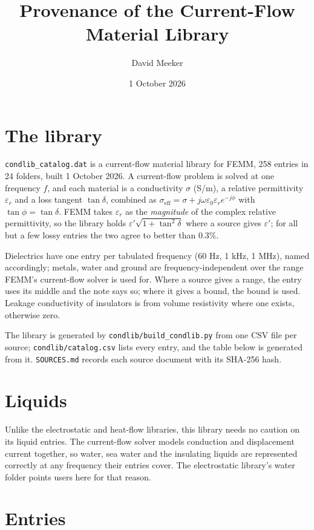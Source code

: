 \documentclass[10pt]{article}
\title{Provenance of the Current-Flow Material Library}
\author{David Meeker}
\date{1 October 2026}
\begin{document}
\maketitle

\section*{The library}

\texttt{condlib\_catalog.dat} is a current-flow material library for FEMM, 258 entries in 24 folders, built 1 October 2026. A current-flow problem is solved at one frequency $f$, and each material is a conductivity $\sigma$ (S/m), a relative permittivity $\varepsilon_r$ and a loss tangent $\tan\delta$, combined as $\sigma_\mathrm{eff} = \sigma + j\omega\varepsilon_0\varepsilon_r e^{-j\phi}$ with $\tan\phi = \tan\delta$. FEMM takes $\varepsilon_r$ as the \emph{magnitude} of the complex relative permittivity, so the library holds $\varepsilon'\sqrt{1+\tan^2\delta}$ where a source gives $\varepsilon'$; for all but a few lossy entries the two agree to better than 0.3\%.

Dielectrics have one entry per tabulated frequency (60 Hz, 1 kHz, 1 MHz), named accordingly; metals, water and ground are frequency-independent over the range FEMM's current-flow solver is used for. Where a source gives a range, the entry uses its middle and the note says so; where it gives a bound, the bound is used. Leakage conductivity of insulators is from volume resistivity where one exists, otherwise zero.

The library is generated by \texttt{condlib/build\_condlib.py} from one CSV file per source; \texttt{condlib/catalog.csv} lists every entry, and the table below is generated from it. \texttt{SOURCES.md} records each source document with its SHA-256 hash.

\section*{Liquids}

Unlike the electrostatic and heat-flow libraries, this library needs no caution on its liquid entries. The current-flow solver models conduction and displacement current together, so water, sea water and the insulating liquids are represented correctly at any frequency their entries cover. The electrostatic library's water folder points users here for that reason.

\section*{Entries}
\end{document}
